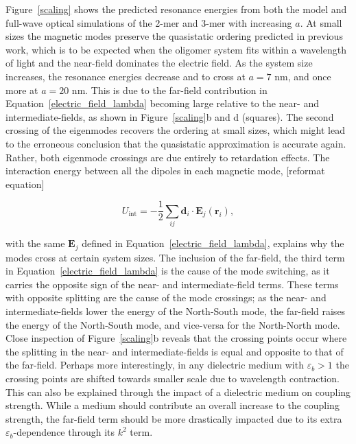 \documentclass[journal=apchd5,manuscript=article]{achemso}
\begin{document}
Figure~\ref{scaling} shows the predicted resonance energies from both the model and full-wave optical simulations of the 2-mer and 3-mer with increasing $a$.\cite{Hohenester2012} At small sizes the magnetic modes preserve the quasistatic ordering predicted in previous work, which is to be expected when the oligomer system fits within a wavelength of light and the near-field dominates the electric field\cite{Cherqui2014}. As the system size increases, the resonance energies decrease and to cross at $a = 7$ nm, and once more at $a = 20$ nm. This is due to the far-field contribution in Equation~\ref{electric_field_lambda} becoming large relative to the near- and intermediate-fields, as shown in Figure~\ref{scaling}b and d (squares). The second crossing of the eigenmodes recovers the ordering at small sizes, which might lead to the erroneous conclusion that the quasistatic approximation is accurate again. Rather, both eigenmode crossings are due entirely to retardation effects. The interaction energy between all the dipoles in each magnetic mode, [reformat equation]

\begin{equation}
U_{\textrm{int}} = -\frac{1}{2} \sum_{ij} \textbf{d}_i \cdot \textbf{E}_j(\textbf{r}_i),
\label{interactionenergy}
\end{equation}

\noindent with the same $\textbf{E}_j$ defined in Equation~\ref{electric_field_lambda}, explains why the modes cross at certain system sizes. The inclusion of the far-field, the third term in Equation~\ref{electric_field_lambda} is the cause of the mode switching, as it carries the opposite sign of the near- and intermediate-field terms. These terms with opposite splitting are the cause of the mode crossings; as the near- and intermediate-fields lower the energy of the North-South mode, the far-field raises the energy of the North-South mode, and vice-versa for the North-North mode. Close inspection of Figure~\ref{scaling}b reveals that the crossing points occur where the splitting in the near- and intermediate-fields is equal and opposite to that of the far-field. Perhaps more interestingly, in any dielectric medium with $\varepsilon_b > 1$ the crossing points are shifted towards smaller scale due to wavelength contraction. This can also be explained through the impact of a dielectric medium on coupling strength. While a medium should contribute an overall increase to the coupling strength, the far-field term should be more drastically impacted due to its extra $\varepsilon_b$-dependence through its $k^2$ term.\cite{Elsayed2008}
\end{document}
